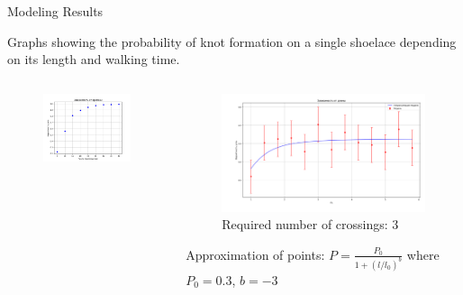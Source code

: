 \begin{frame}{Modeling Results}
\begin{block}{}
Graphs showing the probability of knot formation on a single shoelace depending on its length and walking time.
\end{block}

\begin{columns}
\begin{column}{0.5\linewidth}
\begin{figure}[H]
\includegraphics[width=1\linewidth]{img/time.png}
\end{figure}
\end{column}

\begin{column}{0.5\linewidth}
\begin{figure}[H]
\includegraphics[width=1\linewidth]{img/model_7_er.png}
Required number of crossings: 3
\end{figure}
Approximation of points:
$P = \frac{P_0}{1+(l/l_0)^b}$
where $P_0 = 0.3$, $b = -3$
\end{column}
\end{columns}
\end{frame}

